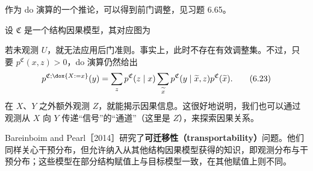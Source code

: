 作为 do 演算的一个推论，可以得到前门调整，见习题 6.65。

\begin{example}[前门调整]
设 $\mathfrak C$ 是一个结构因果模型，其对应图为
\begin{center}
\end{center}
若未观测 $U$，就无法应用后门准则。事实上，此时不存在有效调整集。不过，只要 $p^{\mathfrak C}(x,z)>0$，do 演算仍然给出
\begin{equation}
 p^{\mathfrak C;\dox{X:=x}}(y)
 =\sum_zp^{\mathfrak C}(z\mid x)
 \sum_{\widetilde x}p^{\mathfrak C}(y\mid\widetilde x,z)p^{\mathfrak C}(\widetilde x).
 \tag{6.23}
\end{equation}
在 $X$、$Y$ 之外额外观测 $Z$，就能揭示因果信息。这很好地说明，我们也可以通过观测从 $X$ 向 $Y$ 传递“信号”的“通道”（这里是 $Z$），来探索因果关系。
\end{example}

Bareinboim and Pearl［2014］研究了\textbf{可迁移性（transportability）}问题。他们同样关心干预分布，但允许纳入从其他结构因果模型获得的知识，即观测分布与干预分布；这些模型在部分结构赋值上与目标模型一致，在其他赋值上则不同。
\FloatBarrier
